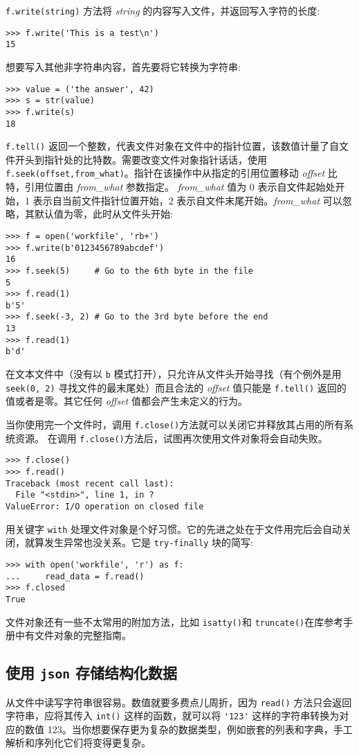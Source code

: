 \texttt{f.write(string)} 方法将 \textit{string} 的内容写入文件，并返回写入字符的长度:
\begin{lstlisting}
>>> f.write('This is a test\n')
15
\end{lstlisting}
想要写入其他非字符串内容，首先要将它转换为字符串:
\begin{lstlisting}
>>> value = ('the answer', 42)
>>> s = str(value)
>>> f.write(s)
18
\end{lstlisting}
\texttt{f.tell()} 返回一个整数，代表文件对象在文件中的指针位置，该数值计量了自文件开头到指针处的比特数。需要改变文件对象指针话话，使用 \cprotect\texttt{f.seek(offset,\verb|from_what|)}。指针在该操作中从指定的引用位置移动 \textit{offset} 比特，引用位置由 \textit{from\_what} 参数指定。 \textit{from\_what} 值为 0 表示自文件起始处开始，1 表示自当前文件指针位置开始，2 表示自文件末尾开始。\textit{from\_what} 可以忽略，其默认值为零，此时从文件头开始:
\begin{lstlisting}
>>> f = open('workfile', 'rb+')
>>> f.write(b'0123456789abcdef')
16
>>> f.seek(5)     # Go to the 6th byte in the file
5
>>> f.read(1)
b'5'
>>> f.seek(-3, 2) # Go to the 3rd byte before the end
13
>>> f.read(1)
b'd'
\end{lstlisting}
在文本文件中（没有以 \verb|b| 模式打开），只允许从文件头开始寻找（有个例外是用 \texttt{seek(0, 2)} 寻找文件的最末尾处）而且合法的 \textit{offset} 值只能是 \texttt{f.tell()} 返回的值或者是零。其它任何 \textit{offset} 值都会产生未定义的行为。

当你使用完一个文件时，调用 \texttt{f.close()}方法就可以关闭它并释放其占用的所有系统资源。 在调用 \texttt{f.close()}方法后，试图再次使用文件对象将会自动失败。
\begin{lstlisting}
>>> f.close()
>>> f.read()
Traceback (most recent call last):
  File "<stdin>", line 1, in ?
ValueError: I/O operation on closed file
\end{lstlisting}
用关键字 \texttt{with} 处理文件对象是个好习惯。它的先进之处在于文件用完后会自动关闭，就算发生异常也没关系。它是 \texttt{try-finally} 块的简写:
\begin{lstlisting}
>>> with open('workfile', 'r') as f:
...     read_data = f.read()
>>> f.closed
True
\end{lstlisting}
文件对象还有一些不太常用的附加方法，比如 \texttt{isatty()}和 \texttt{truncate()}在库参考手册中有文件对象的完整指南。
\subsection{使用 \texttt{json} 存储结构化数据}
从文件中读写字符串很容易。数值就要多费点儿周折，因为 \texttt{read()} 方法只会返回字符串，应将其传入 \texttt{int()} 这样的函数，就可以将 \verb|'123'| 这样的字符串转换为对应的数值 123。当你想要保存更为复杂的数据类型，例如嵌套的列表和字典，手工解析和序列化它们将变得更复杂。

